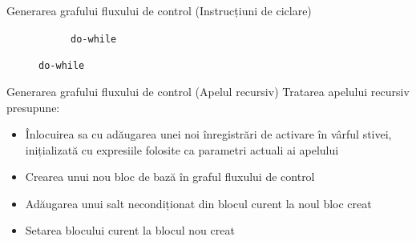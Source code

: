 \documentclass{beamer}
\def\code#1{\texttt{#1}}
\begin{document}
\begin{frame}{Generarea grafului fluxului de control (Instrucțiuni de ciclare)}
\begin{figure}[htb]
\begin{subfigure}[b]{0.32\textwidth}
            \caption{\code{do-while}}
        \end{subfigure}
    \end{figure}
\end{frame}

\begin{frame}{Generarea grafului fluxului de control (Apelul recursiv)}
    Tratarea apelului recursiv presupune:
    \begin{itemize}
        \item Înlocuirea sa cu adăugarea unei noi înregistrări de activare în vârful stivei, inițializată cu
        expresiile folosite ca parametri actuali ai apelului
        \item Crearea unui nou bloc de bază în graful fluxului de control
        \item Adăugarea unui salt necondiționat din blocul curent la noul bloc creat
        \item Setarea blocului curent la blocul nou creat
    \end{itemize}
\end{frame}
\end{document}
